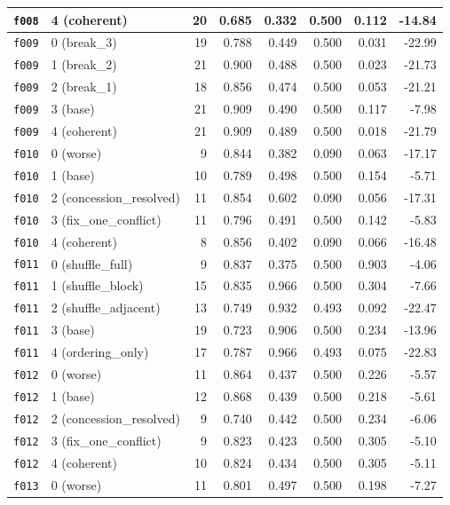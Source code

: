 \documentclass[11pt]{article}
\begin{document}
\begin{table}[htbp]
\begin{tabular}{llrrrrrr}
\texttt{f008} & 4 (coherent) & 20 & 0.685 & 0.332 & 0.500 & 0.112 & -14.84 \\
\midrule
\texttt{f009} & 0 (break\_3) & 19 & 0.788 & 0.449 & 0.500 & 0.031 & -22.99 \\
\texttt{f009} & 1 (break\_2) & 21 & 0.900 & 0.488 & 0.500 & 0.023 & -21.73 \\
\texttt{f009} & 2 (break\_1) & 18 & 0.856 & 0.474 & 0.500 & 0.053 & -21.21 \\
\texttt{f009} & 3 (base) & 21 & 0.909 & 0.490 & 0.500 & 0.117 & -7.98 \\
\texttt{f009} & 4 (coherent) & 21 & 0.909 & 0.489 & 0.500 & 0.018 & -21.79 \\
\midrule
\texttt{f010} & 0 (worse) & 9 & 0.844 & 0.382 & 0.090 & 0.063 & -17.17 \\
\texttt{f010} & 1 (base) & 10 & 0.789 & 0.498 & 0.500 & 0.154 & -5.71 \\
\texttt{f010} & 2 (concession\_resolved) & 11 & 0.854 & 0.602 & 0.090 & 0.056 & -17.31 \\
\texttt{f010} & 3 (fix\_one\_conflict) & 11 & 0.796 & 0.491 & 0.500 & 0.142 & -5.83 \\
\texttt{f010} & 4 (coherent) & 8 & 0.856 & 0.402 & 0.090 & 0.066 & -16.48 \\
\midrule
\texttt{f011} & 0 (shuffle\_full) & 9 & 0.837 & 0.375 & 0.500 & 0.903 & -4.06 \\
\texttt{f011} & 1 (shuffle\_block) & 15 & 0.835 & 0.966 & 0.500 & 0.304 & -7.66 \\
\texttt{f011} & 2 (shuffle\_adjacent) & 13 & 0.749 & 0.932 & 0.493 & 0.092 & -22.47 \\
\texttt{f011} & 3 (base) & 19 & 0.723 & 0.906 & 0.500 & 0.234 & -13.96 \\
\texttt{f011} & 4 (ordering\_only) & 17 & 0.787 & 0.966 & 0.493 & 0.075 & -22.83 \\
\midrule
\texttt{f012} & 0 (worse) & 11 & 0.864 & 0.437 & 0.500 & 0.226 & -5.57 \\
\texttt{f012} & 1 (base) & 12 & 0.868 & 0.439 & 0.500 & 0.218 & -5.61 \\
\texttt{f012} & 2 (concession\_resolved) & 9 & 0.740 & 0.442 & 0.500 & 0.234 & -6.06 \\
\texttt{f012} & 3 (fix\_one\_conflict) & 9 & 0.823 & 0.423 & 0.500 & 0.305 & -5.10 \\
\texttt{f012} & 4 (coherent) & 10 & 0.824 & 0.434 & 0.500 & 0.305 & -5.11 \\
\midrule
\texttt{f013} & 0 (worse) & 11 & 0.801 & 0.497 & 0.500 & 0.198 & -7.27 \\

\end{tabular}
\end{table}
\end{document}
